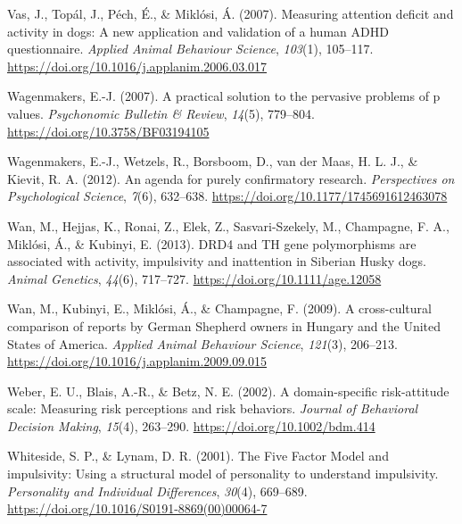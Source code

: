 \documentclass[
  pub,floatsintext]{apa6}
\newlength{\cslhangindent}
\newlength{\cslentryspacingunit} %
\newenvironment{CSLReferences}[2] %
 {%
  \setlength{\parindent}{0pt}
  \ifodd #1
  \let\oldpar\par
  \def\par{\hangindent=\cslhangindent\oldpar}
  \fi
  \setlength{\parskip}{#2\cslentryspacingunit}
 }%
 {}
\begin{document}
\begin{CSLReferences}{1}{0}
\leavevmode{}%
Vas, J., Topál, J., Péch, É., \& Miklósi, Á. (2007). Measuring attention deficit and activity in dogs: {A} new application and validation of a human {ADHD} questionnaire. \emph{Applied Animal Behaviour Science}, \emph{103}(1), 105--117. \url{https://doi.org/10.1016/j.applanim.2006.03.017}

\leavevmode{}%
Wagenmakers, E.-J. (2007). A practical solution to the pervasive problems of p values. \emph{Psychonomic Bulletin \& Review}, \emph{14}(5), 779--804. \url{https://doi.org/10.3758/BF03194105}

\leavevmode{}%
Wagenmakers, E.-J., Wetzels, R., Borsboom, D., van der Maas, H. L. J., \& Kievit, R. A. (2012). An agenda for purely confirmatory research. \emph{Perspectives on Psychological Science}, \emph{7}(6), 632--638. \url{https://doi.org/10.1177/1745691612463078}

\leavevmode{}%
Wan, M., Hejjas, K., Ronai, Z., Elek, Z., Sasvari-Szekely, M., Champagne, F. A., Miklósi, Á., \& Kubinyi, E. (2013). {DRD4} and {TH} gene polymorphisms are associated with activity, impulsivity and inattention in {Siberian Husky} dogs. \emph{Animal Genetics}, \emph{44}(6), 717--727. \url{https://doi.org/10.1111/age.12058}

\leavevmode{}%
Wan, M., Kubinyi, E., Miklósi, Á., \& Champagne, F. (2009). A cross-cultural comparison of reports by {German Shepherd} owners in {Hungary} and the {United States} of {America}. \emph{Applied Animal Behaviour Science}, \emph{121}(3), 206--213. \url{https://doi.org/10.1016/j.applanim.2009.09.015}

\leavevmode{}%
Weber, E. U., Blais, A.-R., \& Betz, N. E. (2002). A domain-specific risk-attitude scale: Measuring risk perceptions and risk behaviors. \emph{Journal of Behavioral Decision Making}, \emph{15}(4), 263--290. \url{https://doi.org/10.1002/bdm.414}

\leavevmode{}%
Whiteside, S. P., \& Lynam, D. R. (2001). The {Five Factor Model} and impulsivity: Using a structural model of personality to understand impulsivity. \emph{Personality and Individual Differences}, \emph{30}(4), 669--689. \url{https://doi.org/10.1016/S0191-8869(00)00064-7}


\end{CSLReferences}
\end{document}
